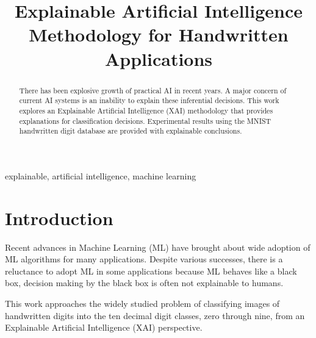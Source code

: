 \documentclass[conference]{IEEEtran}
\begin{document}
\title{Explainable Artificial Intelligence \\ {Methodology for Handwritten Applications}}

\author{

}

\maketitle

\begin{abstract}
There has been explosive growth of practical AI in recent years.
A major concern of current AI systems is an inability to explain these inferential decisions.
This work explores an Explainable Artificial Intelligence (XAI) methodology that provides explanations
for classification decisions.  Experimental results using the MNIST handwritten digit database are provided with explainable conclusions.
\end{abstract}

\begin{IEEEkeywords}
explainable, artificial intelligence, machine learning
\end{IEEEkeywords}

\section{Introduction}

Recent advances in Machine Learning (ML) have brought about wide adoption of ML algorithms for many applications.  Despite various successes, there is a reluctance to adopt ML in some applications because ML behaves like a black box, decision making by the black box is often not explainable to humans.  

This work approaches the widely studied problem of classifying images of handwritten digits into the ten decimal digit classes, zero through nine, from an Explainable Artificial Intelligence (XAI) perspective.
\end{document}
